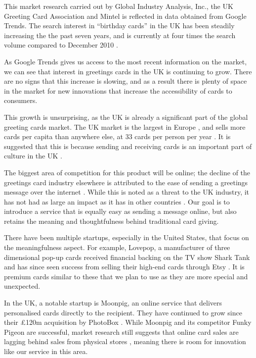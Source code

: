 \documentclass[10pt,a4paper]{article}
\begin{document}
This market research carried out by Global Industry Analysis, Inc., the UK Greeting Card Association and Mintel is reflected in data obtained from Google Trends. The search interest in ``birthday cards'' in the UK has been steadily increasing the the past seven years, and is currently at four times the search volume compared to December 2010 \citep{google_trends}.

As Google Trends gives us access to the most recent information on the market, we can see that interest in greetings cards in the UK is continuing to grow. There are no signs that this increase is slowing, and as a result there is plenty of space in the market for new innovations that increase the accessibility of cards to consumers.

This growth is unsurprising, as the UK is already a significant part of the global greeting cards market. The UK market is the largest in Europe \citep{strategyr}, and sells more cards per capita than anywhere else, at 33 cards per person per year \citep{greetingcardassociation}. It is suggested that this is because sending and receiving cards is an important part of culture in the UK \citep{greetingcardassociation}.

The biggest area of competition for this product will be online; the decline of the greetings card industry elsewhere is attributed to the ease of sending a greetings message over the internet \citep{npr}. While this is noted as a threat to the UK industry, it has not had as large an impact as it has in other countries \citep{mintel}. Our goal is to introduce a service that is equally easy as sending a message online, but also retains the meaning and thoughtfulness behind traditional card giving.

There have been multiple startups, especially in the United States, that focus on the meaningfulness aspect. For example, Lovepop, a manufacturer of three dimensional pop-up cards received financial backing on the TV show Shark Tank \citep{americaninno} and has since seen success from selling their high-end cards through Etsy \citep{Etsy}. It is premium cards similar to these that we plan to use as they are more special and unexpected.

In the UK, a notable startup is Moonpig, an online service that delivers personalised cards directly to the recipient. They have continued to grow since their \pounds120m acquisition by PhotoBox \citep{bbc}. While Moonpig and its competitor Funky Pigeon are successful, market research still suggests that online card sales are lagging behind sales from physical stores \citep{mintel}, meaning there is room for innovation like our service in this area.
\end{document}
